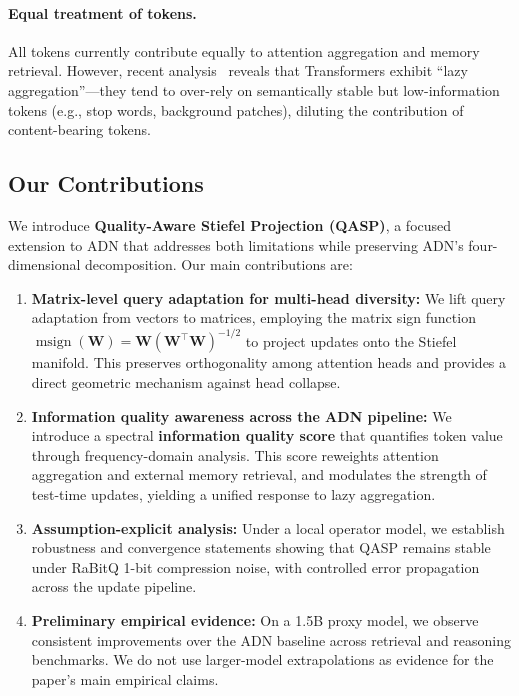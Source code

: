 \documentclass[twocolumn]{article}
\DeclareMathOperator{\msign}{msign}
\begin{document}
\paragraph{Equal treatment of tokens.}
All tokens currently contribute equally to attention aggregation and memory retrieval. However, recent analysis~\cite{lastvit} reveals that Transformers exhibit ``lazy aggregation''---they tend to over-rely on semantically stable but low-information tokens (e.g., stop words, background patches), diluting the contribution of content-bearing tokens.

\subsection{Our Contributions}

We introduce \textbf{Quality-Aware Stiefel Projection (QASP)}, a focused extension to ADN that addresses both limitations while preserving ADN's four-dimensional decomposition. Our main contributions are:

\begin{enumerate}
    \item \textbf{Matrix-level query adaptation for multi-head diversity:} We lift query adaptation from vectors to matrices, employing the matrix sign function $\msign(\mathbf{W})=\mathbf{W}(\mathbf{W}^\top\mathbf{W})^{-1/2}$ to project updates onto the Stiefel manifold. This preserves orthogonality among attention heads and provides a direct geometric mechanism against head collapse.
    
    \item \textbf{Information quality awareness across the ADN pipeline:} We introduce a spectral \textbf{information quality score} that quantifies token value through frequency-domain analysis. This score reweights attention aggregation and external memory retrieval, and modulates the strength of test-time updates, yielding a unified response to lazy aggregation.
    
    \item \textbf{Assumption-explicit analysis:} Under a local operator model, we establish robustness and convergence statements showing that QASP remains stable under RaBitQ 1-bit compression noise, with controlled error propagation across the update pipeline.
    
    \item \textbf{Preliminary empirical evidence:} On a 1.5B proxy model, we observe consistent improvements over the ADN baseline across retrieval and reasoning benchmarks. We do not use larger-model extrapolations as evidence for the paper's main empirical claims.
\end{enumerate}
\end{document}
